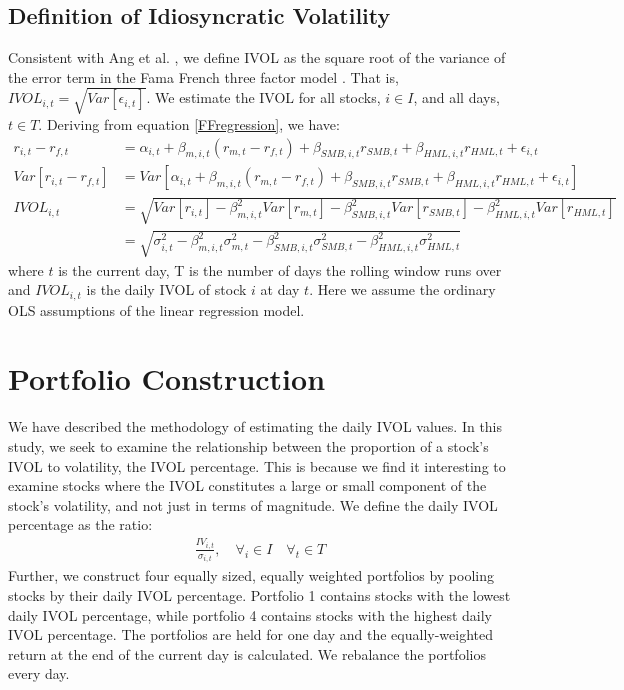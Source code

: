 \subsection{Definition of Idiosyncratic Volatility}
Consistent with Ang et al. \cite{angetal06}, we define IVOL as the square root of the variance of the error term in the Fama French three factor model \cite{famafrench}. That is, $IVOL_{i,t} = \sqrt{Var[\epsilon_{i,t}]}$. We estimate the IVOL for all stocks, $i \in I$, and all days, $t \in T$. Deriving from equation \ref{FFregression}, we have:
 \begin{align}
 r_{i,t} - r_{f,t} &= \alpha_{i,t} + \beta_{m,i,t}(r_{m,t} - r_{f,t}) + \beta_{SMB,i,t}r_{SMB,t} + \beta_{HML,i,t}r_{HML,t} + \epsilon_{i,t} \\
 Var[r_{i,t} - r_{f,t}] &= Var[\alpha_{i,t} + \beta_{m,i,t}(r_{m,t} - r_{f,t}) + \beta_{SMB,i,t}r_{SMB,t} + \beta_{HML,i,t}r_{HML,t} + \epsilon_{i,t}] \\
 IVOL_{i,t} &= \sqrt{Var[r_{i,t}]-\beta_{m,i,t}^2Var[r_{m,t}]-\beta_{SMB,i,t}^2Var[r_{SMB,t}]-\beta_{HML,i,t}^2Var[r_{HML,t}]}  \\ 
 &= \sqrt{\sigma_{i,t}^2 - \beta^2_{m,i,t} \sigma_{m,t}^{2}- \beta^2_{SMB,i,t} \sigma_{SMB,t}^{2}- \beta^2_{HML,i,t} \sigma_{HML,t}^{2}}
 \end{align}
where $t$ is the current day, T is the number of days the rolling window runs over and $IVOL_{i,t}$ is the daily IVOL of stock $i$ at day $t$. Here we assume the ordinary OLS assumptions of the linear regression model. 

\section{Portfolio Construction}
We have described the methodology of estimating the daily IVOL values. In this study, we seek to examine the relationship between the proportion of a stock's IVOL to volatility, the IVOL percentage. This is because we find it interesting to examine stocks where the IVOL constitutes a large or small component of the stock's volatility, and not just in terms of magnitude. We define the daily IVOL percentage as the ratio:
\begin{align}
    \frac{IV_{i,t}}{\sigma_{i,t}}, \quad  \forall_i \in I \quad  \forall_t \in T
\end{align}
Further, we construct four equally sized, equally weighted portfolios by pooling stocks by their daily IVOL percentage. Portfolio 1 contains stocks with the lowest daily IVOL percentage, while portfolio 4 contains stocks with the highest daily IVOL percentage. The portfolios are held for one day and the equally-weighted return at the end of the current day is calculated. We rebalance the portfolios every day. 


